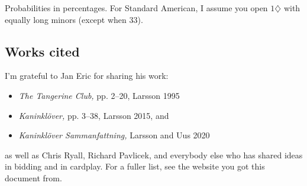 \documentclass[a4paper, twoside, 11pt]{article}
\begin{document}
\begin{multicols}{3}

Probabilities in percentages. For Standard American, I assume you open $1\diamondsuit$ with equally long minors (except when 33).

\subsection{Works cited}
I'm grateful to Jan Eric for sharing his work:
\begin{itemize}
    \item \emph{The Tangerine Club,} pp. 2--20, Larsson 1995
    \item \emph{Kaninklöver,} pp. 3--38, Larsson 2015, and
    \item \emph{Kaninklöver Sammanfattning,} Larsson and Uus 2020
\end{itemize}
as well as Chris Ryall, Richard Pavlicek, and everybody else who has shared ideas in bidding and in cardplay. For a fuller list, see the website you got this document from.

\end{multicols}
\end{document}
